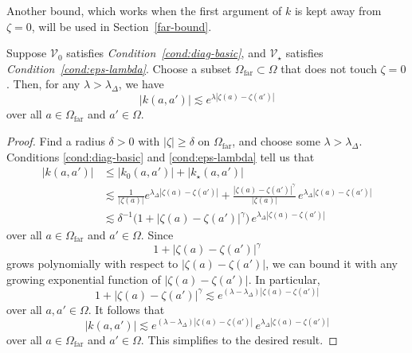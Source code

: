 \documentclass[final]{siamart220329}
\newcommand{\hardpart}{\mathcal{V}_0}
\newcommand{\softpart}{\mathcal{V}_\star}
\newcommand{\kerwhole}{k}
\newcommand{\hardker}{k_0}
\newcommand{\softker}{k_\star}
\newcommand{\domain}{\Omega}
\newcommand{\far}{\Omega_\text{far}}
\begin{document}
Another bound, which works when the first argument of $\kerwhole$ is kept away from $\zeta = 0$, will be used in Section~\ref{far-bound}.
\begin{proposition}\label{prop:whole-ker-far-bound}
Suppose $\hardpart$ satisfies {\em Condition~\eqref{cond:diag-basic}}, and $\softpart$ satisfies {\em Condition~\eqref{cond:eps-lambda}}. Choose a subset $\far \subset \domain$ that does not touch $\zeta = 0$. Then, for any $\lambda > \lambda_\Delta$, we have
\[ |\kerwhole(a,a')| \lesssim e^{\lambda |\zeta(a)-\zeta(a')|} \]
over all $a \in \far$ and $a' \in \domain$.
\end{proposition}
\begin{proof}
Find a radius $\delta > 0$ with $|\zeta| \ge \delta$ on $\far$, and choose some $\lambda > \lambda_\Delta$. Conditions \eqref{cond:diag-basic} and \eqref{cond:eps-lambda} tell us that
\begin{align*}
|\kerwhole(a,a')|&\leq |\hardker(a,a')| + |\softker(a,a')|\\
&\lesssim \frac{1}{|\zeta(a)|} e^{\lambda_\Delta |\zeta(a)-\zeta(a')|} + \frac{|\zeta(a)-\zeta(a')|^\gamma}{|\zeta(a)|}\,e^{\lambda_\Delta|\zeta(a)-\zeta(a')|}\\
&\lesssim \delta^{-1} \big(1 + |\zeta(a)-\zeta(a')|^\gamma \big) \, e^{\lambda_\Delta|\zeta(a)-\zeta(a')|}
\end{align*}
over all $a \in \far$ and $a' \in \domain$. Since
\[ 1 + |\zeta(a)-\zeta(a')|^\gamma \]
grows polynomially with respect to $|\zeta(a)-\zeta(a')|$, we can bound it with any growing exponential function of $|\zeta(a)-\zeta(a')|$. In particular,
\[ 1 + |\zeta(a)-\zeta(a')|^\gamma \lesssim e^{(\lambda - \lambda_\Delta) |\zeta(a)-\zeta(a')|} \]
over all $a, a' \in \domain$. It follows that
\[ |\kerwhole(a,a')| \lesssim e^{(\lambda - \lambda_\Delta) |\zeta(a)-\zeta(a')|} \, e^{\lambda_\Delta|\zeta(a)-\zeta(a')|} \]
over all $a \in \far$ and $a' \in \domain$. This simplifies to the desired result.
\end{proof}
\end{document}
